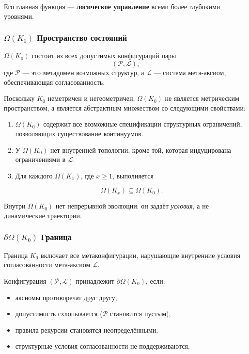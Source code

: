 Его главная функция —
\textbf{логическое управление} всеми более глубокими уровнями.

\subsubsection{\texorpdfstring{$\Omega(K_0)$}{\Omega(K_0)} Пространство состояний}

$\Omega(K_0)$ состоит из всех допустимых конфигураций пары
\[
(\mathcal{P}, \mathcal{L}),
\]
где $\mathcal{P}$ — это метадомен возможных структур, а
$\mathcal{L}$ — система мета-аксиом, обеспечивающая согласованность.

Поскольку $K_0$ неметричен и негеометричен, $\Omega(K_0)$ не является
метрическим пространством, а является абстрактным множеством со следующими
свойствами:
\begin{enumerate}
    \item $\Omega(K_0)$ содержит все возможные спецификации структурных
          ограничений, позволяющих существование континуумов.
    \item У $\Omega(K_0)$ нет внутренней топологии, кроме той,
          которая индуцирована ограничениями в $\mathcal{L}$.
    \item Для каждого $\Omega(K_x)$, где $x \ge 1$, выполняется

          \[
              \Omega(K_x) \subseteq \Omega(K_0).
          \]
\end{enumerate}

Внутри $\Omega(K_0)$ нет непрерывной эволюции: он задаёт
\emph{условия}, а не динамические траектории.

\subsubsection{\texorpdfstring{$\partial\Omega(K_0)$}{\partial\Omega(K_0)} Граница}

Граница $K_0$ включает все метаконфигурации, нарушающие
внутренние условия согласованности мета-аксиом $\mathcal{L}$.

Конфигурация $(\mathcal{P},\mathcal{L})$ принадлежит
$\partial\Omega(K_0)$, если:
\begin{itemize}
    \item аксиомы противоречат друг другу,
    \item допустимость схлопывается ($\mathcal{P}$ становится пустым),
    \item правила рекурсии становятся неопределёнными,
    \item структурные условия согласованности не поддерживаются.
\end{itemize}

